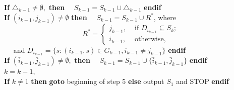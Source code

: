 \documentclass[12pt]{article}
\begin{document}
\begin{itemize}
\textbf{If} $\triangle_{k-1}\not=\emptyset,$ \textbf{then}
$\mbox{ ~ }S_{k-1}=S_{k-1}\cup \triangle_{k-1}$ \textbf{endif}\\
\textbf{If} $(i_{k-1},j_{k-1})\neq \emptyset$ \textbf{then}
$\mbox{ ~ }S_{k-1}=S_{k-1}\cup R^*$, where
\begin{equation*}R^* =
\begin{cases} j_{k-1}, & \text{ if } D_{i_{k-1}}\subseteq S_k;\\
i_{k-1}, & \text{ otherwise},\end{cases}
\end{equation*}
$\mbox{ ~ }$ and $D_{i_{k-1}}=\{s  : (i_{k-1},s)\in G_{k-1},i_{k-1}\ne
j_{k-1}\}$ \textbf{endif}\\
\textbf{If} $(\bar{i}_{k-1}, \bar{j}_{k-1})\not=\emptyset,$ \textbf{then}
$\mbox{ ~ }S_{k-1}=S_{k-1}\cup \{\bar{i}_{k-1}, \bar{j}_{k-1}\}$ \textbf{endif}\\
$ k = k-1$,\\ \textbf{If} $k\neq 1$ \textbf{then} \textbf{goto}
beginning of step 5 \textbf{else} output $S_1$ and STOP
\textbf{endif}
 \end{itemize}
\end{document}
